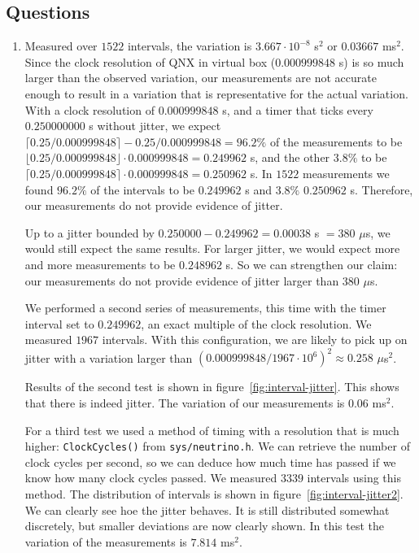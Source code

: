 \documentclass[a4paper,twoside,11pt]{article}
\begin{document}
\FloatBarrier
\subsection{Questions} \label{sec:1_4}
\begin{enumerate}
 \item Measured over $1522$ intervals, the variation is $3.667 \cdot 10^{-8}$ s$^2$ or $0.03667$ ms$^2$. Since the clock resolution of QNX in virtual box ($0.000999848$ s) is so much larger than the observed variation, our measurements are not accurate enough to result in a variation that is representative for the actual variation. With a clock resolution of $0.000999848$ s, and a timer that ticks every $0.250000000$ s without jitter, we expect $\lceil 0.25/0.000999848 \rceil - 0.25/0.000999848 = 96.2\%$ of the measurements to be $\lfloor 0.25/0.000999848 \rfloor \cdot 0.000999848 = 0.249962$ s, and the other $3.8\%$ to be $\lceil 0.25/0.000999848 \rceil \cdot 0.000999848 = 0.250962$ s. In $1522$ measurements we found $96.2\%$ of the intervals to be $0.249962$ s and $3.8\%$ $0.250962$ s. Therefore, our measurements do not provide evidence of jitter.
 
 Up to a jitter bounded by $0.250000 - 0.249962 = 0.00038$ s $= 380$ $\mu$s, we would still expect the same results. For larger jitter, we would expect more and more measurements to be $0.248962$ s. So we can strengthen our claim: our measurements do not provide evidence of jitter larger than $380$ $\mu$s.
 
 We performed a second series of measurements, this time with the timer interval set to $0.249962$, an exact multiple of the clock resolution. We measured $1967$ intervals. With this configuration, we are likely to pick up on jitter with a variation larger than $(0.000999848/1967 \cdot 10^6)^2 \approx 0.258$ $\mu$s$^2$.
 
 Results of the second test is shown in figure~\ref{fig:interval-jitter}. This shows that there is indeed jitter. The variation of our measurements is $0.06$ ms$^2$.
 
 For a third test we used a method of timing with a resolution that is much higher: \texttt{ClockCycles()} from \texttt{sys/neutrino.h}. We can retrieve the number of clock cycles per second, so we can deduce how much time has passed if we know how many clock cycles passed. We measured $3339$ intervals using this method. The distribution of intervals is shown in figure~\ref{fig:interval-jitter2}. We can clearly see hoe the jitter behaves. It is still distributed somewhat discretely, but smaller deviations are now clearly shown. In this test the variation of the measurements is $7.814$ ms$^2$.
 

\end{enumerate}
\end{document}
